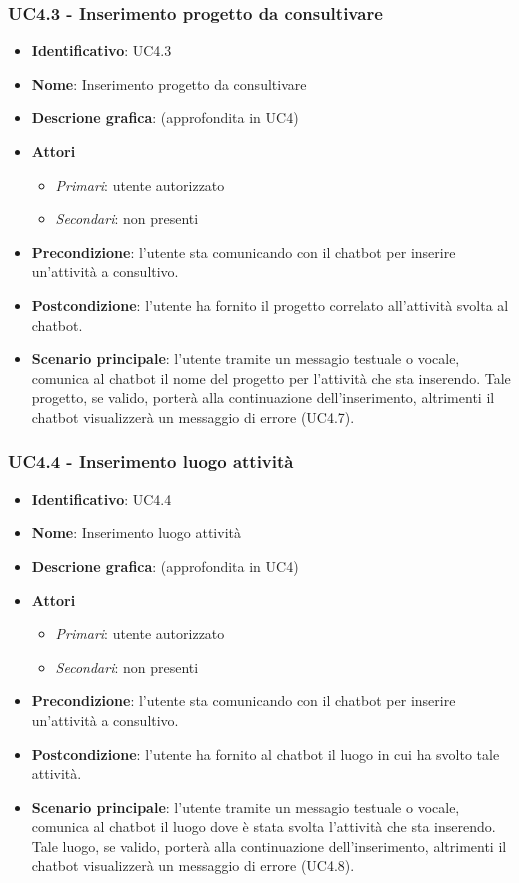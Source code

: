 \subsubsection{UC4.3 - Inserimento progetto da consultivare}
\begin{itemize}
    \item \textbf{Identificativo}: UC4.3 
    \item \textbf{Nome}: Inserimento progetto da consultivare  
    \item \textbf{Descrione grafica}: (approfondita in UC4)
    \item \textbf{Attori}
        \begin{itemize} 
            \item \textit{Primari}: utente autorizzato
            \item \textit{Secondari}: non presenti
        \end{itemize}
    \item \textbf{Precondizione}: l'utente sta comunicando con il chatbot per inserire un'attività a consultivo. 
    \item \textbf{Postcondizione}: l'utente ha fornito il progetto correlato all'attività svolta al chatbot. 
    \item \textbf{Scenario principale}: l'utente tramite un messagio testuale o vocale, comunica al chatbot il nome del progetto per l'attività che sta inserendo. Tale progetto, se valido, porterà alla continuazione dell'inserimento, altrimenti il chatbot visualizzerà un messaggio di errore (UC4.7). 
\end{itemize}

\subsubsection{UC4.4 - Inserimento luogo attività}
\begin{itemize}
    \item \textbf{Identificativo}: UC4.4
    \item \textbf{Nome}: Inserimento luogo  attività  
    \item \textbf{Descrione grafica}: (approfondita in UC4)
    \item \textbf{Attori}
        \begin{itemize} 
            \item \textit{Primari}: utente autorizzato
            \item \textit{Secondari}: non presenti
        \end{itemize}
    \item \textbf{Precondizione}: l'utente sta comunicando con il chatbot per inserire un'attività a consultivo. 
    \item \textbf{Postcondizione}: l'utente ha fornito al chatbot il luogo in cui ha svolto tale attività. 
    \item \textbf{Scenario principale}: l'utente tramite un messagio testuale o vocale, comunica al chatbot il luogo dove è stata svolta l'attività che sta inserendo. Tale luogo, se valido, porterà alla continuazione dell'inserimento, altrimenti il chatbot visualizzerà un messaggio di errore (UC4.8). 
\end{itemize}

